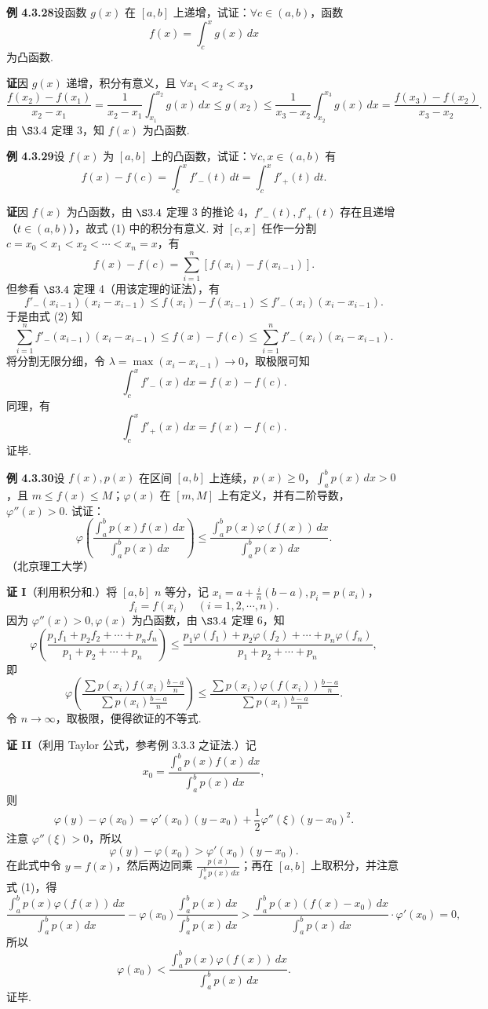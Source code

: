 \documentclass[UTF8,12pt,a4paper,fontset=fandol]{ctexart}
\begin{document}
\noindent\textbf{例 4.3.28}\quad 设函数 $g(x)$ 在 $[a,b]$ 上递增，试证：$\forall c\in(a,b)$，函数
\[
f(x)=\int_c^x g(x)\,dx
\]
为凸函数.

\noindent\textbf{证}\quad 因 $g(x)$ 递增，积分有意义，且 $\forall x_1<x_2<x_3$，
\[
\frac{f(x_2)-f(x_1)}{x_2-x_1}
=\frac1{x_2-x_1}\int_{x_1}^{x_2}g(x)\,dx
\le g(x_2)
\le\frac1{x_3-x_2}\int_{x_2}^{x_3}g(x)\,dx
=\frac{f(x_3)-f(x_2)}{x_3-x_2}.
\]
由 $\S3.4$ 定理 3，知 $f(x)$ 为凸函数.

\noindent\textbf{例 4.3.29}\quad 设 $f(x)$ 为 $[a,b]$ 上的凸函数，试证：$\forall c,x\in(a,b)$ 有
\[
f(x)-f(c)=\int_c^x f'_{-}(t)\,dt
=\int_c^x f'_{+}(t)\,dt.
\tag{1}
\]

\noindent\textbf{证}\quad 因 $f(x)$ 为凸函数，由 $\S3.4$ 定理 3 的推论 4，$f'_{-}(t),f'_{+}(t)$ 存在且递增（$t\in(a,b)$），故式 (1) 中的积分有意义. 对 $[c,x]$ 任作一分割 $c=x_0<x_1<x_2<\cdots<x_n=x$，有
\[
f(x)-f(c)=\sum_{i=1}^n[f(x_i)-f(x_{i-1})].
\tag{2}
\]
但参看 $\S3.4$ 定理 4（用该定理的证法），有
\[
f'_{-}(x_{i-1})(x_i-x_{i-1})
\le f(x_i)-f(x_{i-1})
\le f'_{-}(x_i)(x_i-x_{i-1}).
\]
于是由式 (2) 知
\[
\sum_{i=1}^n f'_{-}(x_{i-1})(x_i-x_{i-1})
\le f(x)-f(c)
\le\sum_{i=1}^n f'_{-}(x_i)(x_i-x_{i-1}).
\]
将分割无限分细，令 $\lambda=\max(x_i-x_{i-1})\to0$，取极限可知
\[
\int_c^x f'_{-}(x)\,dx=f(x)-f(c).
\]
同理，有
\[
\int_c^x f'_{+}(x)\,dx=f(x)-f(c).
\]
证毕.

\noindent\textbf{例 4.3.30}\quad 设 $f(x),p(x)$ 在区间 $[a,b]$ 上连续，$p(x)\ge0$，$\int_a^b p(x)\,dx>0$，且 $m\le f(x)\le M$；$\varphi(x)$ 在 $[m,M]$ 上有定义，并有二阶导数，$\varphi''(x)>0$. 试证：
\[
\varphi\left(\frac{\int_a^b p(x)f(x)\,dx}{\int_a^b p(x)\,dx}\right)
\le
\frac{\int_a^b p(x)\varphi(f(x))\,dx}{\int_a^b p(x)\,dx}.
\]
（北京理工大学）

\noindent\textbf{证 I}\quad （利用积分和.）将 $[a,b]$ $n$ 等分，记 $x_i=a+\frac{i}{n}(b-a),p_i=p(x_i)$，
\[
f_i=f(x_i)\quad(i=1,2,\cdots,n).
\]
因为 $\varphi''(x)>0,\varphi(x)$ 为凸函数，由 $\S3.4$ 定理 6，知
\[
\varphi\left(\frac{p_1f_1+p_2f_2+\cdots+p_nf_n}{p_1+p_2+\cdots+p_n}\right)
\le
\frac{p_1\varphi(f_1)+p_2\varphi(f_2)+\cdots+p_n\varphi(f_n)}
{p_1+p_2+\cdots+p_n},
\]
即
\[
\varphi\left(
\frac{\sum p(x_i)f(x_i)\frac{b-a}{n}}
{\sum p(x_i)\frac{b-a}{n}}
\right)
\le
\frac{\sum p(x_i)\varphi(f(x_i))\frac{b-a}{n}}
{\sum p(x_i)\frac{b-a}{n}}.
\]
令 $n\to\infty$，取极限，便得欲证的不等式.

\noindent\textbf{证 II}\quad （利用 Taylor 公式，参考例 3.3.3 之证法.）记
\[
x_0=\frac{\int_a^b p(x)f(x)\,dx}{\int_a^b p(x)\,dx},
\tag{1}
\]
则
\[
\varphi(y)-\varphi(x_0)
=\varphi'(x_0)(y-x_0)+\frac12\varphi''(\xi)(y-x_0)^2.
\]
注意 $\varphi''(\xi)>0$，所以
\[
\varphi(y)-\varphi(x_0)>\varphi'(x_0)(y-x_0).
\]
在此式中令 $y=f(x)$，然后两边同乘 $\frac{p(x)}{\int_a^b p(x)\,dx}$；再在 $[a,b]$ 上取积分，并注意式 (1)，得
\[
\frac{\int_a^b p(x)\varphi(f(x))\,dx}{\int_a^b p(x)\,dx}
-\varphi(x_0)\frac{\int_a^b p(x)\,dx}{\int_a^b p(x)\,dx}
>
\frac{\int_a^b p(x)(f(x)-x_0)\,dx}{\int_a^b p(x)\,dx}\cdot\varphi'(x_0)=0,
\]
所以
\[
\varphi(x_0)<\frac{\int_a^b p(x)\varphi(f(x))\,dx}{\int_a^b p(x)\,dx}.
\]
证毕.
\end{document}

